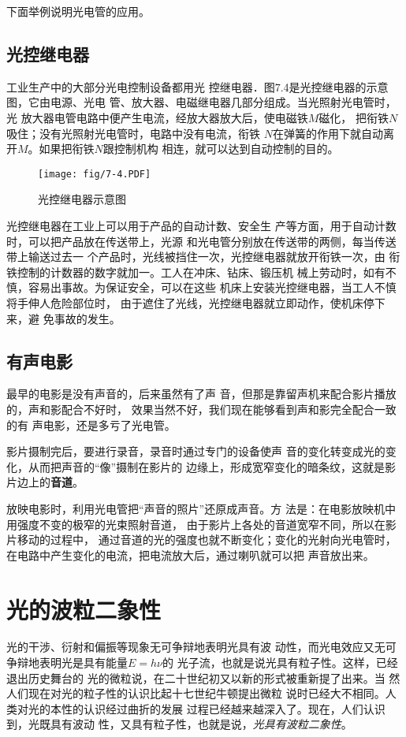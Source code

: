 下面举例说明光电管的应用。

\subsection{光控继电器}

工业生产中的大部分光电控制设备都用光
控继电器．图7.4是光控继电器的示意图，它由电源、光电
管、放大器、电磁继电器几部分组成。当光照射光电管时，光
放大器电管电路中便产生电流，经放大器放大后，使电磁铁$M$磁化，
把衔铁$N$吸住；没有光照射光电管时，电路中没有电流，衔铁
$N$在弹簧的作用下就自动离开$M$。如果把衔铁$N$跟控制机构
相连，就可以达到自动控制的目的。
\begin{figure}[htp]\centering
    \texttt{[image: fig/7-4.PDF]}
    \caption{光控继电器示意图}
    \end{figure}


光控继电器在工业上可以用于产品的自动计数、安全生
产等方面，用于自动计数时，可以把产品放在传送带上，光源
和光电管分别放在传送带的两侧，每当传送带上输送过去一
个产品时，光线被挡住一次，光控继电器就放开衔铁一次，由
衔铁控制的计数器的数字就加一。工人在冲床、钻床、锻压机
械上劳动时，如有不慎，容易出事故。为保证安全，可以在这些
机床上安装光控继电器，当工人不慎将手伸人危险部位时，
由于遮住了光线，光控继电器就立即动作，使机床停下来，避
免事故的发生。


\subsection{有声电影}

最早的电影是没有声音的，后来虽然有了声
音，但那是靠留声机来配合影片播放的，声和影配合不好时，
效果当然不好，我们现在能够看到声和影完全配合一致的有
声电影，还是多亏了光电管。

影片摄制完后，要进行录音，录音时通过专门的设备使声
音的变化转变成光的变化，从而把声音的“像”摄制在影片的
边缘上，形成宽窄变化的暗条纹，这就是影片边上的\textbf{音道}。

放映电影时，利用光电管把“声音的照片”还原成声音。方
法是：在电影放映机中用强度不变的极窄的光束照射音道，
由于影片上各处的音道宽窄不同，所以在影片移动的过程中，
通过音道的光的强度也就不断变化；变化的光射向光电管时，
在电路中产生变化的电流，把电流放大后，通过喇叭就可以把
声音放出来。

\section{光的波粒二象性}
光的干涉、衍射和偏振等现象无可争辩地表明光具有波
动性，而光电效应又无可争辩地表明光是具有能量$E=h\nu$的
光子流，也就是说光具有粒子性。这样，已经退出历史舞台的
光的微粒说，在二十世纪初又以新的形式被重新提了出来。当
然人们现在对光的粒子性的认识比起十七世纪牛顿提出微粒
说时已经大不相同。人类对光的本性的认识经过曲折的发展
过程已经越来越深入了。现在，人们认识到，光既具有波动
性，又具有粒子性，也就是说，\textit{光具有波粒二象性}。

